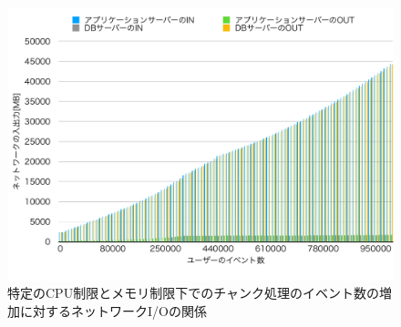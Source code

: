 \documentclass[../../../../../../main]{subfiles}
\begin{document}
    \begin{figure}[H]
        \centering
        \includegraphics[width=12cm]{graph}
        \caption{特定のCPU制限とメモリ制限下でのチャンク処理のイベント数の増加に対するネットワークI/Oの関係}
        \label{fig:stream-netio-app_1_1024-db_1_1024}
    \end{figure}
\end{document}
